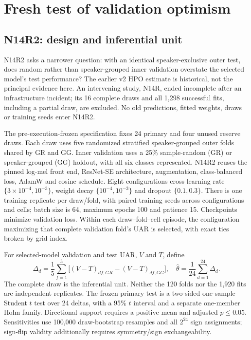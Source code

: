 \documentclass[letterpaper]{article}
\begin{document}
\section{Fresh test of validation optimism}
\subsection{N14R2: design and inferential unit}
N14R2 asks a narrower question: with an identical speaker-exclusive outer test, does random rather than speaker-grouped inner validation overstate the selected model's test performance? The earlier v2 HPO estimate is historical, not the principal evidence here. An intervening study, N14R, ended incomplete after an infrastructure incident; its 16 complete draws and all 1,298 successful fits, including a partial draw, are excluded. No old predictions, fitted weights, draws or training seeds enter N14R2.

The pre-execution-frozen specification fixes 24 primary and four unused reserve draws. Each draw uses five randomized stratified speaker-grouped outer folds shared by GR and GG. Inner validation uses a 25\% sample-random (GR) or speaker-grouped (GG) holdout, with all six classes represented. N14R2 reuses the pinned log-mel front end, ResNet-SE architecture, augmentation, class-balanced loss, AdamW and cosine schedule. Eight configurations cross learning rate $\{3\!\times\!10^{-4},10^{-3}\}$, weight decay $\{10^{-4},10^{-3}\}$ and dropout $\{0.1,0.3\}$. There is one training replicate per draw/fold, with paired training seeds across configurations and cells; batch size is 64, maximum epochs 100 and patience 15. Checkpoints minimize validation loss. Within each draw--fold--cell episode, the configuration maximizing that complete validation fold's UAR is selected, with exact ties broken by grid index.

For selected-model validation and test UAR, $V$ and $T$, define
\begin{equation}
\Delta_d=\frac{1}{5}\sum_{f=1}^{5}
\big[(V-T)_{df,GR}-(V-T)_{df,GG}\big],\quad
\widehat\theta=\frac{1}{24}\sum_{d=1}^{24}\Delta_d.
\end{equation}
The complete draw is the inferential unit. Neither the 120 folds nor the 1,920 fits are independent replicates. The frozen primary test is a two-sided one-sample Student $t$ test over 24 deltas, with a 95\% $t$ interval and a separate one-member Holm family. Directional support requires a positive mean and adjusted $p\leq0.05$. Sensitivities use 100,000 draw-bootstrap resamples and all $2^{24}$ sign assignments; sign-flip validity additionally requires symmetry/sign exchangeability.
\end{document}
